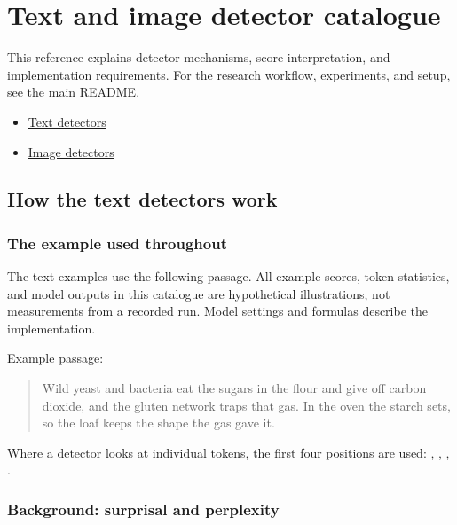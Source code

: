 \section{Text and image detector
catalogue}\label{record-DETECTORS-md-text-and-image-detector-catalogue}

This reference explains detector mechanisms, score interpretation, and
implementation requirements. For the research workflow, experiments, and
setup, see the \href{../README.md}{main README}.

\begin{itemize}
\tightlist
\item
  \hyperref[record-DETECTORS-md-how-the-text-detectors-work]{Text
  detectors}
\item
  \hyperref[record-DETECTORS-md-how-the-image-detectors-work]{Image
  detectors}
\end{itemize}

\subsection{How the text detectors
work}\label{record-DETECTORS-md-how-the-text-detectors-work}

\subsubsection{The example used
throughout}\label{record-DETECTORS-md-the-example-used-throughout}

The text examples use the following passage. All example scores, token
statistics, and model outputs in this catalogue are hypothetical
illustrations, not measurements from a recorded run. Model settings and
formulas describe the implementation.

Example passage:

\begin{quote}
Wild yeast and bacteria eat the sugars in the flour and give off carbon
dioxide, and the gluten network traps that gas. In the oven the starch
sets, so the loaf keeps the shape the gas gave it.
\end{quote}

Where a detector looks at individual tokens, the first four positions
are used: \texttt{}, \texttt{},
\texttt{}, \texttt{}.

\subsubsection{Background: surprisal and
perplexity}\label{record-DETECTORS-md-background-surprisal-and-perplexity}

